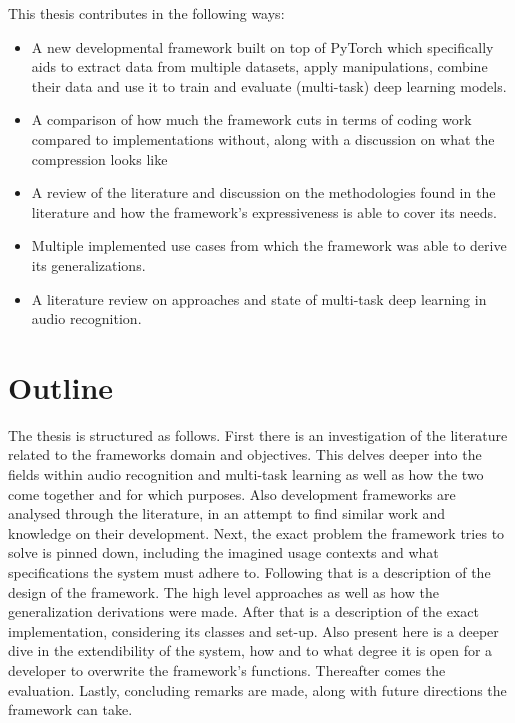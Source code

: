 This thesis contributes in the following ways:

\begin{itemize}
	\item A new developmental framework built on top of PyTorch which specifically aids to extract data from multiple datasets, apply manipulations, combine their data and use it to train and evaluate (multi-task) deep learning models.
	\item A comparison of how much the framework cuts in terms of coding work compared to implementations without, along with a discussion on what the compression looks like
	\item A review of the literature and discussion on the methodologies found in the literature and how the framework's expressiveness is able to cover its needs.
	\item Multiple implemented use cases from which the framework was able to derive its generalizations.
	\item A literature review on approaches and state of multi-task deep learning in audio recognition.
\end{itemize}

\section{Outline}

The thesis is structured as follows. First there is an investigation of the literature related to the frameworks domain and objectives. This delves deeper into the fields within audio recognition and multi-task learning as well as how the two come together and for which purposes. Also development frameworks are analysed through the literature, in an attempt to find similar work and knowledge on their development. Next, the exact problem the framework tries to solve is pinned down, including the imagined usage contexts and what specifications the system must adhere to. Following that is a description of the design of the framework. The high level approaches as well as how the generalization derivations were made. After that is a description of the exact implementation, considering its classes and set-up. Also present here is a deeper dive in the extendibility of the system, how and to what degree it is open for a developer to overwrite the framework's functions. Thereafter comes the evaluation. Lastly, concluding remarks are made, along with future directions the framework can take.